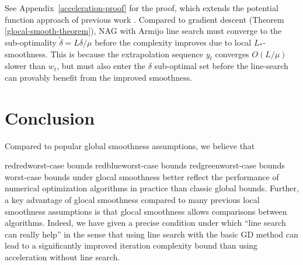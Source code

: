 \documentclass[10pt]{article} %
\newcommand{\yk}{y_t}
\newcommand{\wk}{w_t}
\newif\ifshowcolours
\def\red{red}
\def\blue{blue}
\def\green{green}
\renewcommand{\textcolor}[2]{%
  \ifshowcolours
    {\color{#1}#2}%
  \else
    \def\temp{#1}%
    \ifx\temp\red     #2\else
    \ifx\temp\blue    #2\else
    \ifx\temp\green   #2\else
        {\color{#1}#2}%
    \fi\fi\fi
  \fi
}
\begin{document}
See Appendix~\ref{acceleration-proof} for the proof, which extends the
potential function approach of previous work \cite{daspremont2021acceleration}.
Compared to gradient descent (Theorem \ref{glocal-smooth-theorem}), NAG
with Armijo line search must converge to the  sub-optimality 
\( \tilde{\delta} = L \delta / \mu \) before the complexity improves due to local \( L_* \)-smoothness.
This is because the extrapolation sequence \( \yk \) converges \( O(L / \mu) \) slower than \( \wk \), but must also enter the \( \delta \) sub-optimal set before the line-search can provably benefit from the improved smoothness. 




\section{Conclusion}\label{Discussion}
Compared to popular global smoothness assumptions, we believe that \textcolor{red}{worst-case bounds} under glocal smoothness better reflect the performance of numerical optimization algorithms in practice than classic global bounds. 
Further, a key advantage of glocal smoothness compared to many previous local smoothness assumptions is that glocal smoothness allows comparisons between algorithms. Indeed, we have given a precise condition under which ``line search can really help'' in the sense that using line search with the basic GD method can lead to a significantly improved iteration complexity bound than using acceleration without line search. 
\end{document}
